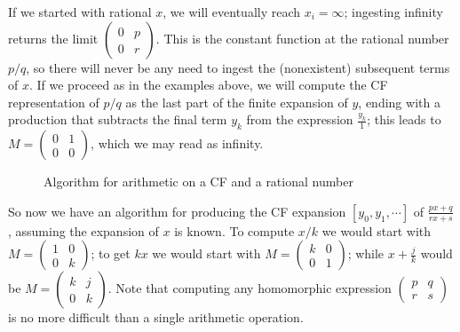 \documentclass[11pt, oneside]{amsart}   	%
\newcommand{\pqrs}{\left(
\begin{smallmatrix} 
p & q\\ 
r & s 
\end{smallmatrix}
\right)}
\renewcommand{\:}{\negthickspace:\negthickspace}
\begin{document}
If we started with rational $x$, we will eventually reach $x_i = \infty$; ingesting infinity returns the limit ${\left(
\begin{smallmatrix} 
0 & p\\ 
0 & r
\end{smallmatrix}
\right)}$.
This is the constant function at the rational number $p/q$, so there will never be any need to ingest the (nonexistent) subsequent 
terms of $x$. If we proceed as in the examples above, we will compute the CF representation of $p/q$ as the last part of the finite
expansion of $y$, ending with a production that subtracts the final term $y_k$ from the expression $\frac{y_k}{1}$; this leads to
$M=\left(\begin{smallmatrix}0 & 1 \\ 0 & 0\end{smallmatrix}\right)$, which we may read as infinity.

\begin{figure}\label{fig:oneCFarith}
\begin{algorithmic}
\STATE{}
\STATE{}\COMMENT{input $M = \pqrs$}
\STATE{}
 
 
 
           \ENDWHILE
\ENDWHILE
\end{algorithmic}
\caption{Algorithm for arithmetic on a CF and a rational number}
\end{figure}

So now we have an algorithm for producing the CF expansion $[y_0,y_1,\cdots]$ of $\frac{px+q}{rx+s}$,
assuming the expansion of $x$ is known.
To compute $x/k$ we would start with $M=\left(
\begin{smallmatrix} 
1 & 0\\ 
0 & k 
\end{smallmatrix}
\right)$; 
to get $kx$ we would start with $M=\left(
\begin{smallmatrix} 
k & 0\\ 
0 & 1 
\end{smallmatrix}
\right)$; while $x+\frac{j}{k}$ would be $M=\left(
\begin{smallmatrix} 
k & j\\ 
0 & k 
\end{smallmatrix}
\right)$. Note that computing any homomorphic expression $\pqrs$ is no more difficult than a single arithmetic operation.
\end{document}
